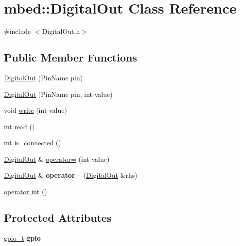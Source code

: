 \hypertarget{classmbed_1_1_digital_out}{}\section{mbed\+:\+:Digital\+Out Class Reference}
\label{classmbed_1_1_digital_out}


{\ttfamily \#include $<$Digital\+Out.\+h$>$}

\subsection*{Public Member Functions}
\begin{DoxyCompactItemize}
\item 
\hyperlink{classmbed_1_1_digital_out_aad0eaa96c3fad0b2e31c167d616fe3c2}{Digital\+Out} (Pin\+Name pin)
\item 
\hyperlink{classmbed_1_1_digital_out_a6068274615ee97f1ff3a3ceb701faa26}{Digital\+Out} (Pin\+Name pin, int value)
\item 
void \hyperlink{classmbed_1_1_digital_out_a780c53a27d6ef36e8f57dc796d4c117c}{write} (int value)
\item 
int \hyperlink{classmbed_1_1_digital_out_aee5b6dba79cb58aa87a18b3dc38621bd}{read} ()
\item 
int \hyperlink{classmbed_1_1_digital_out_ae0166d6aa26e5befe5a51058a132503c}{is\+\_\+connected} ()
\item 
\hyperlink{classmbed_1_1_digital_out}{Digital\+Out} \& \hyperlink{classmbed_1_1_digital_out_a99e9d68df5fb296fbaf1c682aae3ce41}{operator=} (int value)
\item 
\hyperlink{classmbed_1_1_digital_out}{Digital\+Out} \& {\bfseries operator=} (\hyperlink{classmbed_1_1_digital_out}{Digital\+Out} \&rhs)\hypertarget{classmbed_1_1_digital_out_ad3a4dbb96e5cef32aefdf2e98ea7baf2}{}\label{classmbed_1_1_digital_out_ad3a4dbb96e5cef32aefdf2e98ea7baf2}

\item 
\hyperlink{classmbed_1_1_digital_out_afa966c7a9c8a66c499839c7be55d2d9b}{operator int} ()
\end{DoxyCompactItemize}
\subsection*{Protected Attributes}
\begin{DoxyCompactItemize}
\item 
\hyperlink{structgpio__t}{gpio\+\_\+t} {\bfseries gpio}\hypertarget{classmbed_1_1_digital_out_a3f5716320aba4d372a74107f95a97c81}{}\label{classmbed_1_1_digital_out_a3f5716320aba4d372a74107f95a97c81}

\end{DoxyCompactItemize}


